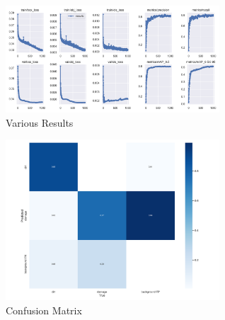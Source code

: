 \documentclass[conference]{IEEEtran}
\begin{document}
\begin{figure}[H]
    \centering
    \includegraphics[width=8cm]{Images/YOLOv5s/results.png}
    \caption{Various Results}
\end{figure}

\begin{figure}[H]
    \centering
    \includegraphics[width=8cm]{Images/Confusion Matrices/sconfusion_matrix.png}
    \caption{Confusion Matrix}
\end{figure}
\end{document}
